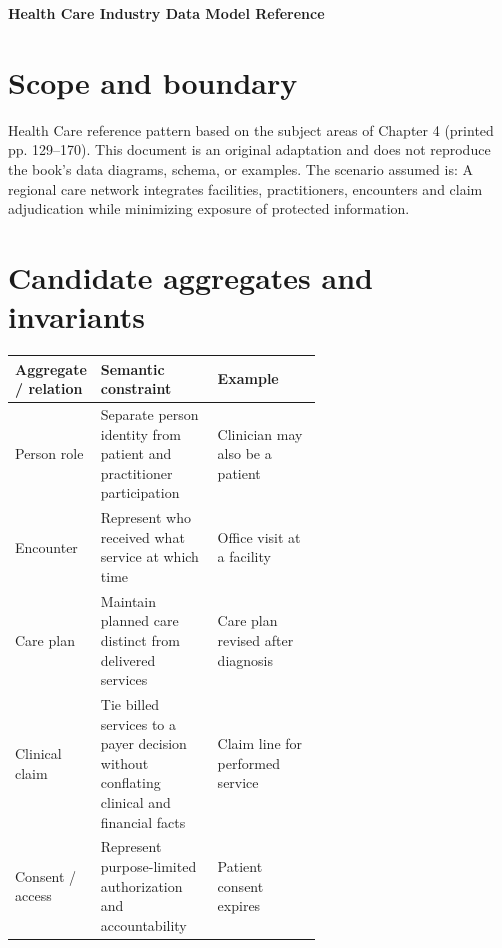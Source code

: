 \documentclass[11pt,letterpaper]{article}
\begin{document}
\begin{center}
{\LARGE\bfseries\color{navy} Health Care Industry Data Model Reference}\par
\vspace{0.25em}{\large Conceptual to logical reference | original adaptation}\par
{}
\end{center}
\vspace{0.8em}
\section{Scope and boundary}
Health Care reference pattern based on the subject areas of Chapter 4 (printed pp. 129--170). This document is an original adaptation and does not reproduce the book's data diagrams, schema, or examples. The scenario assumed is: A regional care network integrates facilities, practitioners, encounters and claim adjudication while minimizing exposure of protected information.


\section{Candidate aggregates and invariants}
\begin{tabularx}{\linewidth}{@{}>{\raggedright\arraybackslash}p{0.23\linewidth} >{\raggedright\arraybackslash}p{0.38\linewidth}>{\raggedright\arraybackslash}X@{}}
\toprule
\textbf{Aggregate / relation} & \textbf{Semantic constraint} & \textbf{Example} \\ 
\midrule
Person role & Separate person identity from patient and practitioner participation & Clinician may also be a patient \\ 
Encounter & Represent who received what service at which time & Office visit at a facility \\ 
Care plan & Maintain planned care distinct from delivered services & Care plan revised after diagnosis \\ 
Clinical claim & Tie billed services to a payer decision without conflating clinical and financial facts & Claim line for performed service \\ 
Consent / access & Represent purpose-limited authorization and accountability & Patient consent expires \\ 
\bottomrule
\end{tabularx}
\end{document}
